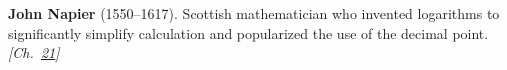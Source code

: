 \textbf{John Napier} (1550–1617). Scottish mathematician who invented logarithms to significantly simplify calculation and popularized the use of the decimal point. \emph{[Ch.~\hyperref[ch:exponentialmapslietheory]{21}]}

